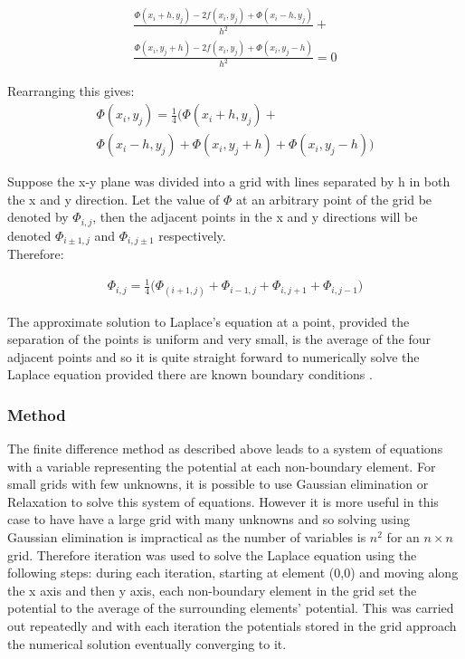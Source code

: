 \documentclass[aps,twocolumn,pre,nofootinbib,10pt]{revtex4-1}
\begin{document}
\begin{gather*}
\frac{\Phi(x_i+h,y_j)-2f(x_i,y_j)+\Phi(x_i-h,y_j)}{h^2}+ \\
\frac{\Phi(x_i,y_j+h)-2f(x_i,y_j)+\Phi(x_i,y_j-h)}{h^2}=0
\end{gather*}

Rearranging this gives:
\begin{gather*}
\Phi(x_i,y_j)=\frac{1}{4}\Bigg(\Phi(x_i+h,y_j)+ \\
\Phi(x_i-h,y_j)+\Phi(x_i,y_j+h)+\Phi(x_i,y_j-h)\Bigg)
\end{gather*}

Suppose the x-y plane was divided into a grid with lines separated by h in both the x and y direction. Let the value of \(\Phi\) at an arbitrary point of the grid be denoted by \(\Phi_{i,j}\), then the adjacent points in the x and y directions will be denoted \(\Phi_{i\pm1,j}\) and \(\Phi_{i,j\pm1}\) respectively.\\Therefore:

\begin{gather*}
\Phi_{i,j}=\frac{1}{4}\Bigg(\Phi_{(i+1,j)}+
\Phi_{i-1,j}+\Phi_{i,j+1}+\Phi_{i,j-1}\Bigg)
\end{gather*}

The approximate solution to Laplace's equation at a point, provided the separation of the points is uniform and very small, is the average of the four adjacent points and so it is quite straight forward to numerically solve the Laplace equation provided there are known boundary conditions \cite{compmethods}.

\subsubsection{Method}

The finite difference method as described above leads to a system of equations with a variable representing the potential at each non-boundary element. For small grids with few unknowns, it is possible to use Gaussian elimination or Relaxation \cite{recipes_c} to solve this system of equations. However it is more useful in this case to have have a large grid with many unknowns and so solving using Gaussian elimination is impractical as the number of variables is \(n^2\) for an \(n \times n\) grid. Therefore iteration was used to solve the Laplace equation using the following steps: during each iteration, starting at element (0,0) and moving along the x axis and then y axis, each non-boundary element in the grid set the potential to the average of the surrounding elements' potential. This was carried out repeatedly and with each iteration the potentials stored in the grid approach the numerical solution eventually converging to it.
\end{document}
